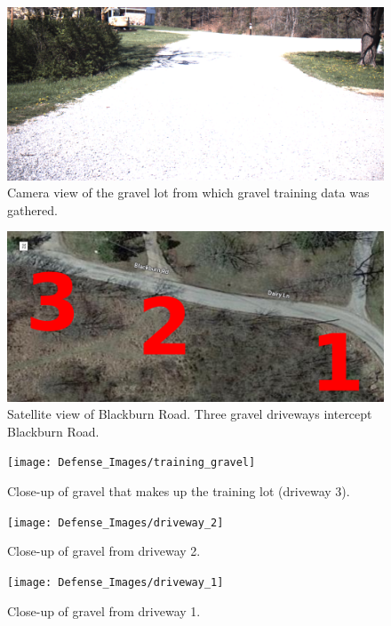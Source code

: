\documentclass[numbered,pdftex]{ohio-etd}
\begin{document}
{{{{				%
				\begin{figure}[H]
					\centering
					\includegraphics[width=0.75\linewidth]{Defense_Images/gravel_training_lot}
					\caption[Gravel Training Lot]{Camera view of the gravel lot from which gravel training data was gathered.}
					\label{fig:gravel_training_lot}
				\end{figure}
				
				\begin{figure}[H]
					\centering
					\includegraphics[width=0.75\linewidth]{Defense_Images/three_driveways_sat}
					\caption[Satellite View of Blackburn Road]{Satellite view of Blackburn Road. Three gravel driveways intercept Blackburn Road. }
					\label{fig:three_driveways_sat}
				\end{figure}
				
				\begin{figure}[H]
					\centering
					\texttt{[image: Defense\_Images/training\_gravel]}
					\caption[Training Gravel]{Close-up of gravel that makes up the training lot (driveway 3).}
					\label{fig:training_gravel}
				\end{figure}
				
				\begin{figure}[H]
					\centering
					\texttt{[image: Defense\_Images/driveway\_2]}
					\caption[Driveway 2 Gravel]{Close-up of gravel from driveway 2.}
					\label{fig:driveway_2}
				\end{figure}
				
				\begin{figure}[H]
					\centering
					\texttt{[image: Defense\_Images/driveway\_1]}
					\caption[Driveway 2 Gravel]{Close-up of gravel from driveway 1.}
					\label{fig:driveway_1}
				\end{figure}
				
}}}}
\end{document}
